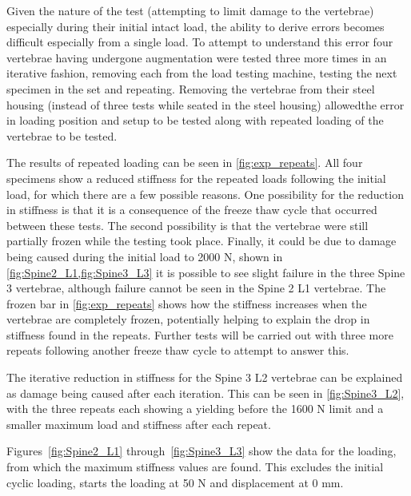 Given the nature of the test (attempting to limit damage to the vertebrae)
especially during their initial intact load, the ability to derive errors
becomes difficult especially from a single load. To attempt to understand this
error four vertebrae having undergone augmentation were tested three more times
in an iterative fashion, removing each from the load testing machine, testing
the next specimen in the set and repeating. Removing the vertebrae from their
steel housing (instead of three tests while seated in the steel housing)
allowedthe error in loading position and setup to be tested along with repeated
loading of the vertebrae to be tested.

The results of repeated loading can be seen in \cref{fig:exp_repeats}. All
four specimens show a reduced stiffness for the repeated loads following the
initial load, for which there are a few possible reasons. One possibility for
the reduction in stiffness is that it is a consequence of the freeze thaw cycle
that occurred between these tests. The second possibility is that the vertebrae
were still partially frozen while the testing took place. Finally, it could be
due to damage being caused during the initial load to 2000 N, shown in
\cref{fig:Spine2_L1,fig:Spine3_L3} it is possible to see slight failure
in the three Spine 3 vertebrae, although failure cannot be seen in the Spine 2
L1 vertebrae. The frozen bar in \cref{fig:exp_repeats} shows how the
stiffness increases when the vertebrae are completely frozen, potentially
helping to explain the drop in stiffness found in the repeats. Further tests
will be carried out with three more repeats following another freeze thaw cycle
to attempt to answer this.

The iterative reduction in stiffness for the Spine 3 L2 vertebrae can be
explained as damage being caused after each iteration. This can be seen in
\cref{fig:Spine3_L2}, with the three repeats each showing a yielding
before the 1600 N limit and a smaller maximum load and stiffness after each
repeat.

Figures~\ref{fig:Spine2_L1} through~\ref{fig:Spine3_L3} show the data for the
loading, from which the maximum stiffness values are found. This excludes the
initial cyclic loading, starts the loading at 50 N and displacement at 0 mm.

